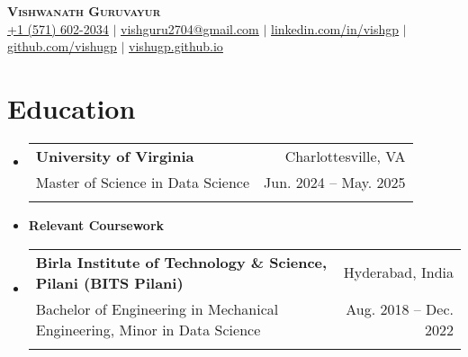 \documentclass[letter paper,11pt]{article}
\makeatletter
\newcommand{\resumeSubheading}[5]{%
  \item
    \begin{tabular*}
    {1\textwidth}
    {l@{\extracolsep{\fill}}r}
      \textbf{#1} & \small#2 \\
      {\small#3} & {\small #4} \\
      {\small#5}
    \end{tabular*}%
  \vspace{-0.8cm}
}
\newcommand{\resumeSubHeadingListStart}{\begin{itemize}[leftmargin=0.0in, label={}]}
\newcommand{\resumeSubHeadingListEnd}{\end{itemize}}
\makeatother
\begin{document}


\begin{center}
    \textbf{\Huge \scshape Vishwanath Guruvayur} \\ 
    \vspace{5pt}
    \small 
    \href{tel:+1 (571) 602-2034}{\underline{+1 (571) 602-2034}} $|$ \href{mailto:vishvesh2704@gmail.com}{\underline{vishguru2704@gmail.com}} $|$ 
    \href{https://linkedin.com/in/vishgp}{\underline{linkedin.com/in/vishgp}} $|$
    \href{https://github.com/vishugp}{\underline{github.com/vishugp}} $|$
    \href{https://vishugp.github.io}{\underline{vishugp.github.io}}
\end{center}


\section{Education}
    \resumeSubHeadingListStart
    \resumeSubheading
         {\textbf{University of Virginia}}{Charlottesville, VA}
        {Master of Science in Data Science}{Jun. 2024 -- May. 2025}{}

        \vspace{-1pt}
        \item\small{{\textbf{Relevant Coursework}}}
        \vspace{-0.25cm}
    \justifying

 \vspace{-6pt}
        
    \resumeSubheading
        {\textbf{Birla Institute of Technology \& Science, Pilani (BITS Pilani)}}{Hyderabad, India}
        {Bachelor of Engineering in Mechanical Engineering, Minor in Data Science}{Aug. 2018 -- Dec. 2022}{}


 \resumeSubHeadingListEnd 
%
\end{document}
